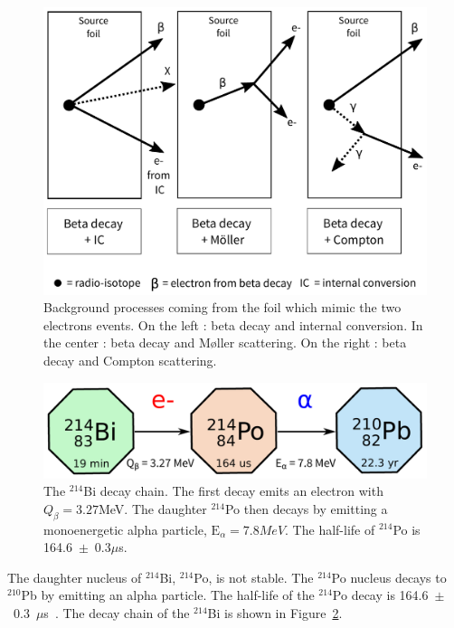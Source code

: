 \documentclass[main.tex]{subfiles}
\begin{document}
\begin{figure}[h!]
\begin{center}
\includegraphics[scale=0.5]{pictures/Chap5/internal_bkg.pdf}
\caption{Background processes coming from the foil which mimic the two electrons events. On the left : beta decay and internal conversion. In the center : beta decay and M\o ller scattering. On the right : beta decay and Compton scattering.}
\label{Backgroungs}
\end{center}
\end{figure}


\begin{figure}[h!]
\begin{center}
\includegraphics[scale=0.6]{pictures/Chap5/decay_chain_bi.pdf}
\caption{The $^{214}$Bi decay chain. The first decay emits an electron with $Q_{\beta} = 3.27$MeV. The daughter $^{214}$Po then decays by emitting a monoenergetic alpha particle, $\text{E}_{\alpha} = 7.8 MeV$. The half-life of $^{214}$Po is 164.6~$\pm$~0.3$\mu$s.}
\label{BiPoChain}
\end{center}
\end{figure}


\bigskip 

\noindent The daughter nucleus of $^{214}$Bi, $^{214}$Po, is not stable. The $^{214}$Po nucleus decays to $^{210}$Pb by emitting an alpha particle. The half-life of the $^{214}$Po decay is 164.6~$\pm$~0.3~$\mu$s~\cite{Polonium}. The decay chain of the $^{214}$Bi is shown in Figure~\ref{BiPoChain}.  
\end{document}
